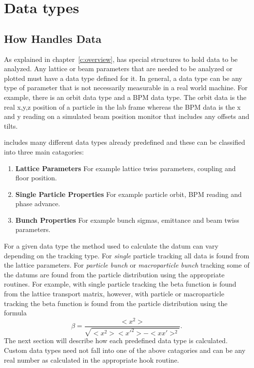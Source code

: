 \chapter{Data types}
\label{c:data_types}

\section{How \tao Handles Data}

As explained in chapter~\ref{c:overview}, \tao has special structures to hold
data to be analyzed. Any lattice or beam parameters that are needed to be
analyzed or plotted must have a data type defined for it. In general, a data
type can be any type of parameter that is not necessarily measurable in a real
world machine. For example, there is an orbit data type and a BPM data type. The
orbit data is the real x,y,z position of a particle in the lab frame whereas the BPM
data is the x and y reading on a simulated beam position monitor that includes
any offsets and tilts.

\tao includes many different data types already predefined and
these can be classified into three main catagories:
\begin{enumerate}
  \item \textbf{Lattice Parameters} \Newline
    For example lattice twiss parameters, coupling and floor position.
  \item \textbf{Single Particle Properties} \Newline
    For example particle orbit, BPM reading and phase advance.
  \item \textbf{Bunch Properties} \Newline
    For example bunch sigmas, emittance and beam twiss parameters.
\end{enumerate}
For a given data type the method used to calculate the datum can vary depending
on the tracking type. For {\it single} particle tracking all data is found from
the lattice parameters. For \textit{particle bunch} or \textit{macroparticle
bunch} tracking some of the datums  are found from the
particle distribution using the appropriate \bmad routines. For example, with
single particle tracking the beta function is found from the lattice transport
matrix, however, with particle or macroparticle tracking the beta function is
found from the particle distribution using the formula
\begin{equation}
  \beta = \frac{<x^{2}>}{\sqrt{<x^{2}> <x'^{2}> - <x x'>^{2}}}.
\end{equation}
The next section will describe how each predefined data type is calculated.
Custom data types need not fall into one of the above catagories and can be any
real number as calculated in the appropriate hook routine.

